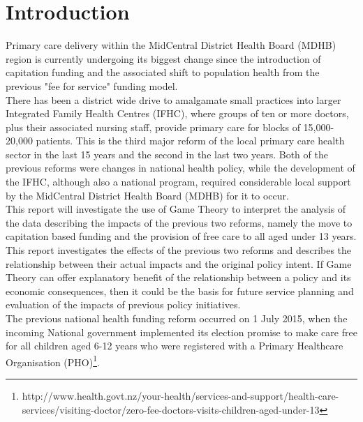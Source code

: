 \documentclass[11pt,a4paper]{article}
\begin{document}
\tableofcontents


\pagebreak
\pagebreak


\listoffigures


\pagebreak
\section{Introduction}
Primary care delivery within the MidCentral District Health Board (MDHB) region is currently undergoing its biggest change since the introduction of capitation funding and the associated shift to population health from the previous "fee for service" funding model.\\


There has been a district wide drive to amalgamate small practices into larger Integrated Family Health Centres (IFHC), where groups of ten or more doctors, plus their associated nursing staff, provide primary care for blocks of  15,000-20,000 patients. This is the third major reform of the local primary care health sector in the last 15 years and the second in the last two years. Both of the previous reforms were changes in national health policy, while the development of the IFHC, although also a national program, required considerable local support by the MidCentral District Health Board (MDHB) for it to occur. \\


This report will investigate the use of Game Theory to interpret the analysis of the data describing the impacts of the previous two reforms, namely the move to capitation based funding and the provision of  free care to all aged under 13 years. This report investigates the effects of the previous two reforms and describes the relationship between their actual impacts and the original policy intent. If Game Theory can offer explanatory benefit of the relationship between a policy and its economic consequences, then it could be the basis for future service planning and evaluation of the impacts of previous policy initiatives.\\ 


The previous national health funding reform occurred on 1 July 2015, when the incoming National government implemented its election promise to make care free for all children aged 6-12 years who were registered with a Primary Healthcare Organisation (PHO)\footnote{http://www.health.govt.nz/your-health/services-and-support/health-care-services/visiting-doctor/zero-fee-doctors-visits-children-aged-under-13}.\\
\end{document}
